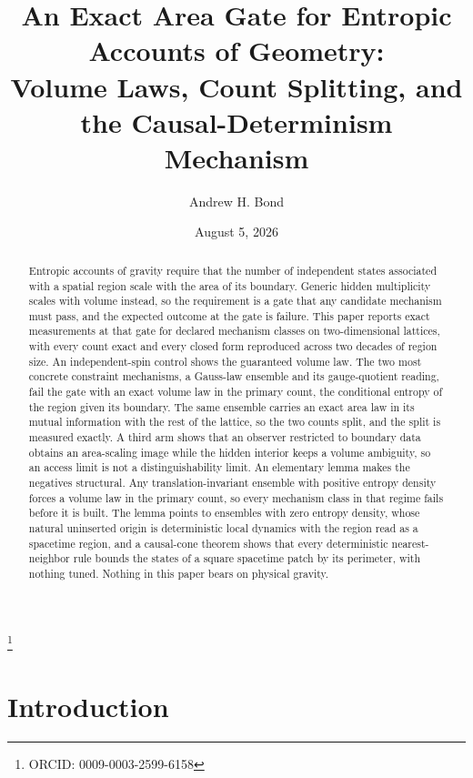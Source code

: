 \documentclass[aps,pre,reprint,nofootinbib]{revtex4-2}
\begin{document}
\title{An Exact Area Gate for Entropic Accounts of Geometry:\\
Volume Laws, Count Splitting, and the Causal-Determinism Mechanism}

\author{Andrew H. Bond}
\thanks{ORCID: 0009-0003-2599-6158}
\date{August 5, 2026}

\begin{abstract}
Entropic accounts of gravity require that the number of independent states
associated with a spatial region scale with the area of its boundary.
Generic hidden multiplicity scales with volume instead, so the requirement
is a gate that any candidate mechanism must pass, and the expected outcome
at the gate is failure.  This paper reports exact measurements at that gate
for declared mechanism classes on two-dimensional lattices, with every
count exact and every closed form reproduced across two decades of region
size.  An independent-spin control shows the guaranteed volume law.  The
two most concrete constraint mechanisms, a Gauss-law ensemble and its
gauge-quotient reading, fail the gate with an exact volume law in the
primary count, the conditional entropy of the region given its boundary.
The same ensemble carries an exact area law in its mutual information with
the rest of the lattice, so the two counts split, and the split is
measured exactly.  A third arm shows that an observer restricted to
boundary data obtains an area-scaling image while the hidden interior
keeps a volume ambiguity, so an access limit is not a distinguishability
limit.  An elementary lemma makes the negatives structural.  Any
translation-invariant ensemble with positive entropy density forces a
volume law in the primary count, so every mechanism class in that regime
fails before it is built.  The lemma points to ensembles with zero entropy
density, whose natural uninserted origin is deterministic local dynamics
with the region read as a spacetime region, and a causal-cone theorem
shows that every deterministic nearest-neighbor rule bounds the states of
a square spacetime patch by its perimeter, with nothing tuned.  Nothing in
this paper bears on physical gravity.
\end{abstract}

\maketitle

\section{Introduction}
\label{sec:intro}
\end{document}
